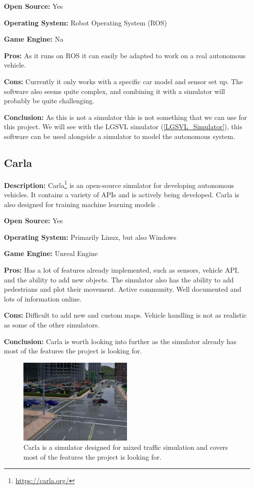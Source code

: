 \textbf{Open Source:} Yes

\textbf{Operating System:} Robot Operating System (ROS)

\textbf{Game Engine:} Na

\textbf{Pros:} As it runs on ROS it can easily be adapted to work on a real autonomous vehicle.

\textbf{Cons:} Currently it only works with a specific car model and sensor set up. The software also seems quite complex, and combining it with a simulator will probably be quite challenging.

\textbf{Conclusion:} As this is not a simulator this is not something that we can use for this project. We will see with the LGSVL simulator (\ref{LGSVL_Simulator}), this software can be used alongside a simulator to model the autonomous system. 


\subsection{Carla} \label{Carla}
\textbf{Description:} Carla\footnote{\url{https://carla.org/}} is an open-source simulator for developing autonomous vehicles. It contains a variety of APIs and is actively being developed. Carla is also designed for training machine learning models \cite{CarlaPaper}. 

\textbf{Open Source:} Yes

\textbf{Operating System:} Primarily Linux, but also Windows

\textbf{Game Engine:} Unreal Engine

\textbf{Pros:} Has a lot of features already implemented, such as sensors, vehicle API, and the ability to add new objects. The simulator also has the ability to add pedestrians and plot their movement. Active community. Well documented and lots of information online. 

\textbf{Cons:} Difficult to add new and custom maps. Vehicle handling is not as realistic as some of the other simulators.

\textbf{Conclusion:} Carla is worth looking into further as the simulator already has most of the features the project is looking for.


\begin{figure}[H]
    \centering
    \includegraphics[width=0.5\textwidth]{03_Background/Appendix/Simulators/Carla.JPG}
    \caption[Carla]{Carla is a simulator designed for mixed traffic simulation and covers most of the features the project is looking for.}
\end{figure}


